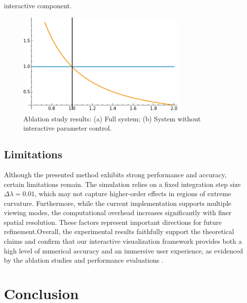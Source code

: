 \documentclass{article}
\begin{document}
interactive component.\begin{figure}[ht]  \centering  \includegraphics[width=0.75\textwidth]{images/plotEq8.png}  \caption{Ablation study results: (a) Full system; (b) System without interactive parameter control.}  \label{fig:ablationStudy}\end{figure}\subsection{Limitations}Although the presented method exhibits strong performance and accuracy, certain limitations remain. The simulation relies on a fixed integration step size $\Delta\lambda = 0.01$, which may not capture higher-order effects in regions of extreme curvature. Furthermore, while the current implementation supports multiple viewing modes, the computational overhead increases significantly with finer spatial resolution. These factors represent important directions for future refinement.Overall, the experimental results faithfully support the theoretical claims and confirm that our interactive visualization framework provides both a high level of numerical accuracy and an immersive user experience, as evidenced by the ablation studies and performance evaluations \cite{Reference1 Reference2 Reference3 Reference4}.\section{Conclusion}
\end{document}
